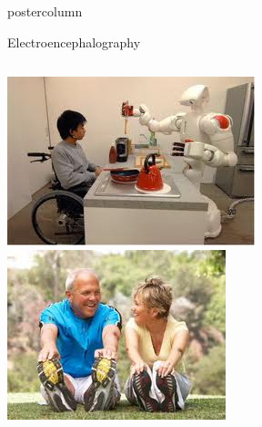 \documentclass[final]{beamer}
\begin{document}
\begin{frame}
\begin{columns}
\begin{column}{.49\textwidth}
\begin{beamercolorbox}[center,wd=\textwidth]{postercolumn}
\begin{minipage}[T]{.95\textwidth}
{\begin{block}{Electroencephalography}
\begin{columns}
\begin{column}{.39\textwidth}
\-
                    \includegraphics[width=0.95\linewidth]{images/viola/disabilities}
\-                                                                                  
		    \includegraphics[width=0.95\linewidth]{images/viola/exercise}
\-

                \end{column}
              \end{columns}
            \end{block}

            \vfill
            
}
\end{minipage}
\end{beamercolorbox}
\end{column}
\end{columns}
\end{frame}
\end{document}
